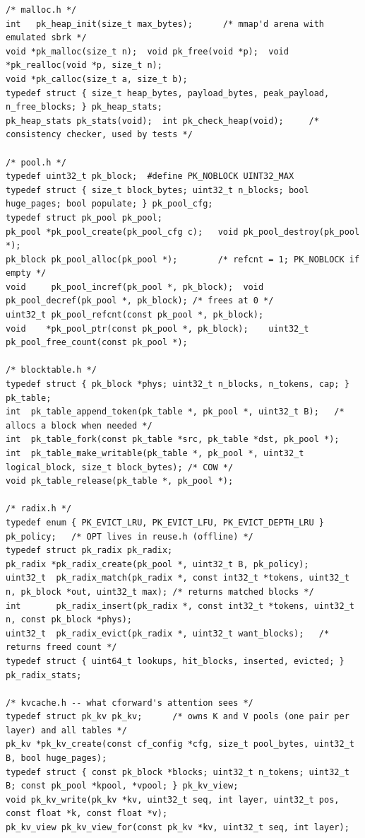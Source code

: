 \begin{lstlisting}[style=c]
/* malloc.h */
int   pk_heap_init(size_t max_bytes);      /* mmap'd arena with emulated sbrk */
void *pk_malloc(size_t n);  void pk_free(void *p);  void *pk_realloc(void *p, size_t n);
void *pk_calloc(size_t a, size_t b);
typedef struct { size_t heap_bytes, payload_bytes, peak_payload, n_free_blocks; } pk_heap_stats;
pk_heap_stats pk_stats(void);  int pk_check_heap(void);     /* consistency checker, used by tests */

/* pool.h */
typedef uint32_t pk_block;  #define PK_NOBLOCK UINT32_MAX
typedef struct { size_t block_bytes; uint32_t n_blocks; bool huge_pages; bool populate; } pk_pool_cfg;
typedef struct pk_pool pk_pool;
pk_pool *pk_pool_create(pk_pool_cfg c);   void pk_pool_destroy(pk_pool *);
pk_block pk_pool_alloc(pk_pool *);        /* refcnt = 1; PK_NOBLOCK if empty */
void     pk_pool_incref(pk_pool *, pk_block);  void pk_pool_decref(pk_pool *, pk_block); /* frees at 0 */
uint32_t pk_pool_refcnt(const pk_pool *, pk_block);
void    *pk_pool_ptr(const pk_pool *, pk_block);    uint32_t pk_pool_free_count(const pk_pool *);

/* blocktable.h */
typedef struct { pk_block *phys; uint32_t n_blocks, n_tokens, cap; } pk_table;
int  pk_table_append_token(pk_table *, pk_pool *, uint32_t B);   /* allocs a block when needed */
int  pk_table_fork(const pk_table *src, pk_table *dst, pk_pool *);
int  pk_table_make_writable(pk_table *, pk_pool *, uint32_t logical_block, size_t block_bytes); /* COW */
void pk_table_release(pk_table *, pk_pool *);

/* radix.h */
typedef enum { PK_EVICT_LRU, PK_EVICT_LFU, PK_EVICT_DEPTH_LRU } pk_policy;   /* OPT lives in reuse.h (offline) */
typedef struct pk_radix pk_radix;
pk_radix *pk_radix_create(pk_pool *, uint32_t B, pk_policy);
uint32_t  pk_radix_match(pk_radix *, const int32_t *tokens, uint32_t n, pk_block *out, uint32_t max); /* returns matched blocks */
int       pk_radix_insert(pk_radix *, const int32_t *tokens, uint32_t n, const pk_block *phys);
uint32_t  pk_radix_evict(pk_radix *, uint32_t want_blocks);   /* returns freed count */
typedef struct { uint64_t lookups, hit_blocks, inserted, evicted; } pk_radix_stats;

/* kvcache.h -- what cforward's attention sees */
typedef struct pk_kv pk_kv;      /* owns K and V pools (one pair per layer) and all tables */
pk_kv *pk_kv_create(const cf_config *cfg, size_t pool_bytes, uint32_t B, bool huge_pages);
typedef struct { const pk_block *blocks; uint32_t n_tokens; uint32_t B; const pk_pool *kpool, *vpool; } pk_kv_view;
void pk_kv_write(pk_kv *kv, uint32_t seq, int layer, uint32_t pos, const float *k, const float *v);
pk_kv_view pk_kv_view_for(const pk_kv *kv, uint32_t seq, int layer);


\end{lstlisting}
